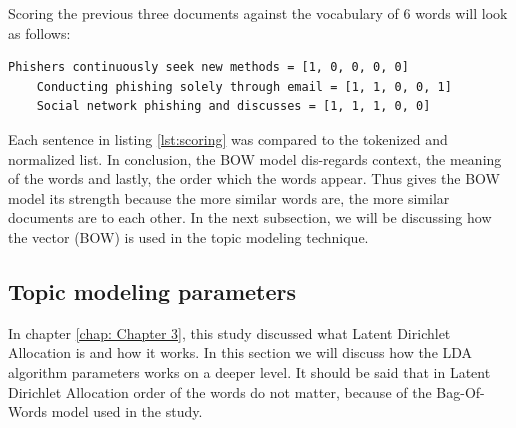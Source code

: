 Scoring the previous three documents against the vocabulary of 6 words will look as follows:
\begin{lstlisting}[language=Text, label={lst:scoring}, caption=Scoring the documents]
    Phishers continuously seek new methods = [1, 0, 0, 0, 0]
    Conducting phishing solely through email = [1, 1, 0, 0, 1]
    Social network phishing and discusses = [1, 1, 1, 0, 0]
\end{lstlisting}
Each sentence in listing \ref{lst:scoring} was compared to the tokenized and normalized list. 
In conclusion, the BOW model dis-regards context, the meaning of the words and lastly, the order which the words appear. Thus gives the BOW model its strength because the more similar  words are, the more similar documents are to each other. In the next subsection, we will be discussing how the vector (BOW) is used in the topic modeling technique.

\subsection{Topic modeling parameters} \label{ssec:LDA}

In chapter \ref{chap: Chapter 3}, this study discussed what Latent Dirichlet Allocation is and how it works. In this section we will discuss how the LDA algorithm parameters works on a deeper level. It should be said that in Latent Dirichlet Allocation order of the words do not matter, because of the Bag-Of-Words model used in the study. 


